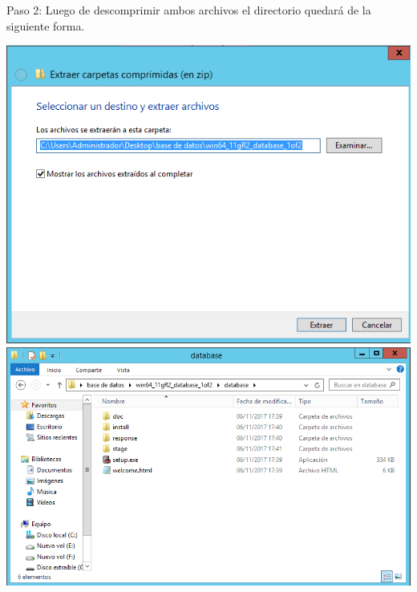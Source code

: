 \documentclass[a4paper,openright,12pt]{book}
\begin{document}
Paso 2: Luego de descomprimir ambos archivos el directorio quedará de la siguiente forma.\\
\begin{center}
\includegraphics[width=15cm]{./windows server/2.png}
\includegraphics[width=15cm]{./windows server/3.png}
\end{center}
\end{document}
